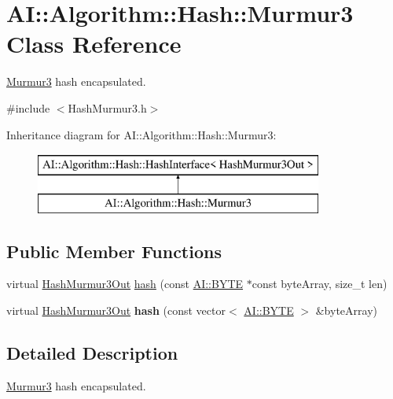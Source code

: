 \hypertarget{classAI_1_1Algorithm_1_1Hash_1_1Murmur3}{\section{A\+I\+:\+:Algorithm\+:\+:Hash\+:\+:Murmur3 Class Reference}
\label{classAI_1_1Algorithm_1_1Hash_1_1Murmur3}
}


\hyperlink{classAI_1_1Algorithm_1_1Hash_1_1Murmur3}{Murmur3} hash encapsulated.  




{\ttfamily \#include $<$Hash\+Murmur3.\+h$>$}

Inheritance diagram for A\+I\+:\+:Algorithm\+:\+:Hash\+:\+:Murmur3\+:\begin{figure}[H]
\begin{center}
\leavevmode
\includegraphics[height=2.000000cm]{classAI_1_1Algorithm_1_1Hash_1_1Murmur3}
\end{center}
\end{figure}
\subsection*{Public Member Functions}
\begin{DoxyCompactItemize}
\item 
virtual \hyperlink{structAI_1_1Algorithm_1_1Hash_1_1HashMurmur3Out}{Hash\+Murmur3\+Out} \hyperlink{classAI_1_1Algorithm_1_1Hash_1_1Murmur3_ab79d4cbd685e34c88077d58e5cacf7a3}{hash} (const \hyperlink{namespaceAI_a9d4bcda82fe0f9aac3c4861e24491581}{A\+I\+::\+B\+Y\+T\+E} $\ast$const byte\+Array, size\+\_\+t len)
\item 
\hypertarget{classAI_1_1Algorithm_1_1Hash_1_1Murmur3_a552acfee5455ac802af225bfd89d80db}{virtual \hyperlink{structAI_1_1Algorithm_1_1Hash_1_1HashMurmur3Out}{Hash\+Murmur3\+Out} {\bfseries hash} (const vector$<$ \hyperlink{namespaceAI_a9d4bcda82fe0f9aac3c4861e24491581}{A\+I\+::\+B\+Y\+T\+E} $>$ \&byte\+Array)}\label{classAI_1_1Algorithm_1_1Hash_1_1Murmur3_a552acfee5455ac802af225bfd89d80db}

\end{DoxyCompactItemize}


\subsection{Detailed Description}
\hyperlink{classAI_1_1Algorithm_1_1Hash_1_1Murmur3}{Murmur3} hash encapsulated. 

